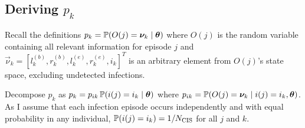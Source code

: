 \documentclass[thesis.tex]{subfiles}
\begin{document}

\subsection{Deriving $p_k$}

Recall the definitions $p_k = \operatorname{\mathbb{P}}(O(j) = \bm{\nu}_k \mid \bm{\theta})$ where $O(j)$ is the random variable containing all relevant information for episode $j$ and $\vec{\nu}_k = [l^{(b)}_k, r^{(b)}_k, l^{(e)}_k, r^{(e)}_k, i_k]^T$ is an arbitrary element from $O(j)$'s state space, excluding undetected infections.

Decompose $p_k$ as $p_k = p_{ik} \operatorname{\mathbb{P}}(i(j) = i_k \mid \bm{\theta})$
where $p_{ik} = \operatorname{\mathbb{P}}(O(j) = \bm{\nu}_k \mid i(j) = i_k, \bm{\theta})$.
As I assume that each infection episode occurs independently and with equal probability in any individual, $\operatorname{\mathbb{P}}(i(j) = i_k) = 1/N_\text{CIS}$ for all $j$ and $k$.
\end{document}
